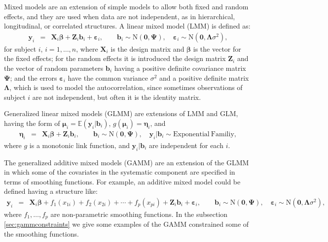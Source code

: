 \documentclass[11pt,letterpaper]{article}
\begin{document}
Mixed models are an extension of simple models to allow both fixed and random effects, and they are used when data are not independent, as in hierarchical,  longitudinal, or correlated structures. 
A linear mixed model (LMM) is defined as:  
\begin{eqnarray*}
\boldsymbol{y}_i &=& \boldsymbol{X}_i\boldsymbol{\beta} + \boldsymbol{Z}_i\boldsymbol{b}_i + \boldsymbol{\varepsilon}_i, 
\qquad 
\boldsymbol{b}_i\sim\mathrm{N}(\boldsymbol{0},\boldsymbol{\Psi}), 
\quad 
\boldsymbol{\varepsilon}_i\sim\mathrm{N}(\boldsymbol{0},\boldsymbol{\Lambda}\sigma^2), 
\end{eqnarray*}
for subject $i$, $i=1,\ldots,n$, 
where $\boldsymbol{X}_i$ is the design matrix and $\boldsymbol{\beta}$ is the vector  for the fixed effects; for the random effects it is introduced the design matrix   $\boldsymbol{Z}_i$ and the vector of random parameters $\boldsymbol{b}_i$ having a positive definite covariance matrix $\boldsymbol{\Psi}$;  and the errors $\boldsymbol{\varepsilon}_i$  have the common variance  $\sigma^2$ and a positive definite matrix $\boldsymbol{\Lambda}$, which is used to model the autocorrelation, since sometimes observations of subject $i$ are not independent, but often it is the identity matrix. 

Generalized linear mixed models (GLMM) are extensions of LMM and GLM, having the form of $\boldsymbol{\mu}_i=\mathbb{E}(\boldsymbol{y}_i|\boldsymbol{b}_i)$, $g(\boldsymbol{\mu}_i)=\boldsymbol{\eta}_i$, and 
\begin{eqnarray*}
\boldsymbol{\eta}_i &=& \boldsymbol{X}_i\boldsymbol{\beta} + \boldsymbol{Z}_i\boldsymbol{b}_i , 
\qquad 
\boldsymbol{b}_i\sim\mathrm{N}(\boldsymbol{0},\boldsymbol{\Psi}), 
\quad 
\boldsymbol{y}_{i}|\boldsymbol{b}_i\sim\mathrm{Exponential\ Familiy},
\end{eqnarray*}
where $g$ is a monotonic link function, and  $\boldsymbol{y}_i|\boldsymbol{b}_i$ are independent for each $i$. 

The generalized additive mixed models (GAMM) are an extension of the GLMM in which some of the covariates in the systematic component  are specified in terms of smoothing functions. For example, an additive mixed model could be defined having a structure like:  
\begin{eqnarray*}
\boldsymbol{y}_i &=& \boldsymbol{X}_i\boldsymbol{\beta} + f_1(x_{1i})+ f_2(x_{2i})+\cdots+ f_p(x_{pi}) + \boldsymbol{Z}_i\boldsymbol{b}_i + \boldsymbol{\varepsilon}_i, 
\qquad 
\boldsymbol{b}_i\sim\mathrm{N}(\boldsymbol{0},\boldsymbol{\Psi}), 
\quad 
\boldsymbol{\varepsilon}_i\sim\mathrm{N}(\boldsymbol{0},\boldsymbol{\Lambda}\sigma^2)  ,
\end{eqnarray*}
where $f_1,\ldots,f_p$ are non-parametric smoothing functions. In the subsection \ref{sec:gammconstraints} we give some examples of the GAMM constrained some of the smoothing functions. 
\end{document}
